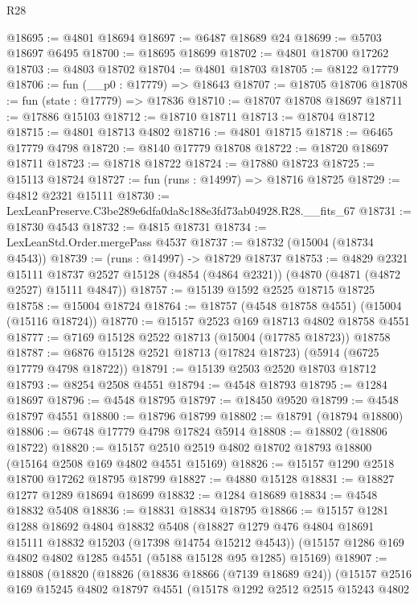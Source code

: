 \begin{lexlean}{R28}
\begin{coremodule}
@18695 := @4801 @18694
@18697 := @6487 @18689 @24
@18699 := @5703 @18697 @6495
@18700 := @18695 @18699
@18702 := @4801 @18700 @17262
@18703 := @4803 @18702
@18704 := @4801 @18703
@18705 := @8122 @17779
@18706 := fun (__p0 : @17779) => @18643
@18707 := @18705 @18706
@18708 := fun (state : @17779) => @17836
@18710 := @18707 @18708 @18697
@18711 := @17886 @15103
@18712 := @18710 @18711
@18713 := @18704 @18712
@18715 := @4801 @18713 @4802
@18716 := @4801 @18715
@18718 := @6465 @17779 @4798
@18720 := @8140 @17779 @18708
@18722 := @18720 @18697 @18711
@18723 := @18718 @18722
@18724 := @17880 @18723
@18725 := @15113 @18724
@18727 := fun (runs : @14997) => @18716 @18725
@18729 := @4812 @2321 @15111
@18730 := LexLeanPreserve.C3be289e6dfa0da8c188e3fd73ab04928.R28.__fits_67
@18731 := @18730 @4543
@18732 := @4815 @18731
@18734 := LexLeanStd.Order.mergePass @4537
@18737 := @18732 (@15004 (@18734 @4543))
@18739 := (runs : @14997) -> @18729 @18737
@18753 := @4829
    @2321
    @15111
    @18737
    @2527
    @15128
    (@4854 (@4864 @2321))
    (@4870 (@4871 (@4872 @2527) @15111 @4847))
@18757 := @15139 @1592 @2525 @18715 @18725
@18758 := @15004 @18724
@18764 := @18757 (@4548 @18758 @4551) (@15004 (@15116 @18724))
@18770 := @15157 @2523 @169 @18713 @4802 @18758 @4551
@18777 := @7169 @15128 @2522 @18713 (@15004 (@17785 @18723)) @18758
@18787 := @6876 @15128 @2521 @18713 (@17824 @18723) (@5914 (@6725 @17779 @4798 @18722))
@18791 := @15139 @2503 @2520 @18703 @18712
@18793 := @8254 @2508 @4551
@18794 := @4548 @18793
@18795 := @1284 @18697
@18796 := @4548 @18795
@18797 := @18450 @9520
@18799 := @4548 @18797 @4551
@18800 := @18796 @18799
@18802 := @18791 (@18794 @18800)
@18806 := @6748 @17779 @4798 @17824 @5914
@18808 := @18802 (@18806 @18722)
@18820 := @15157 @2510 @2519 @4802 @18702 @18793 @18800 (@15164 @2508 @169 @4802 @4551 @15169)
@18826 := @15157 @1290 @2518 @18700 @17262 @18795 @18799
@18827 := @4880 @15128
@18831 := @18827 @1277 @1289 @18694 @18699
@18832 := @1284 @18689
@18834 := @4548 @18832 @5408
@18836 := @18831 @18834 @18795
@18866 := @15157
    @1281
    @1288
    @18692
    @4804
    @18832
    @5408
    (@18827 @1279 @476 @4804 @18691 @15111 @18832 @15203 (@17398 @14754 @15212 @4543))
    (@15157 @1286 @169 @4802 @4802 @1285 @4551 (@5188 @15128 @95 @1285) @15169)
@18907 := @18808
    (@18820
      (@18826
        (@18836 @18866 (@7139 @18689 @24))
        (@15157
          @2516
          @169
          @15245
          @4802
          @18797
          @4551
          (@15178
            @1292
            @2512
            @2515
            @15243
            @4802

\end{coremodule}
\end{lexlean}
